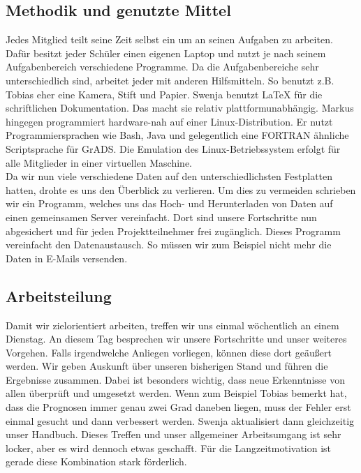 \documentclass[a4paper,oneside,12pt,titlepage]{article}
\begin{document}
    \subsection{Methodik und genutzte Mittel}
        Jedes Mitglied teilt seine Zeit selbst ein um an seinen Aufgaben zu arbeiten. Dafür besitzt jeder Schüler einen eigenen Laptop und nutzt je nach seinem Aufgabenbereich verschiedene Programme. Da die Aufgabenbereiche sehr unterschiedlich sind, arbeitet jeder mit anderen Hilfsmitteln. So benutzt z.B. Tobias eher eine Kamera, Stift und Papier. Swenja benutzt LaTeX für die schriftlichen Dokumentation. Das macht sie relativ plattformunabhängig. Markus hingegen programmiert hardware-nah auf einer Linux-Distribution. Er nutzt Programmiersprachen wie Bash, Java und gelegentlich eine FORTRAN ähnliche Scriptsprache für GrADS. Die Emulation des Linux-Betriebssystem erfolgt für alle Mitglieder in einer virtuellen Maschine. \\Da wir nun viele verschiedene Daten auf den unterschiedlichsten Festplatten hatten, drohte es uns den Überblick zu verlieren. Um dies zu vermeiden schrieben wir ein Programm, welches uns das Hoch- und Herunterladen von Daten auf einen gemeinsamen Server vereinfacht. Dort sind unsere Fortschritte nun abgesichert und für jeden Projektteilnehmer frei zugänglich. Dieses Programm vereinfacht den Datenaustausch. So müssen wir zum Beispiel nicht mehr die Daten in E-Mails versenden. 
    \subsection{Arbeitsteilung}
        Damit wir zielorientiert arbeiten, treffen wir uns einmal wöchentlich an einem Dienstag. An diesem Tag besprechen wir unsere Fortschritte und unser weiteres Vorgehen. Falls irgendwelche Anliegen vorliegen, können diese dort geäußert werden. Wir geben Auskunft über unseren bisherigen Stand und führen die Ergebnisse zusammen. Dabei ist besonders wichtig, dass neue Erkenntnisse von allen überprüft und umgesetzt werden. Wenn zum Beispiel Tobias bemerkt hat, dass die Prognosen immer genau zwei Grad daneben liegen, muss der Fehler erst einmal gesucht und dann verbessert werden. Swenja aktualisiert dann gleichzeitig unser Handbuch. Dieses Treffen und unser allgemeiner Arbeitsumgang ist sehr locker, aber es wird dennoch etwas geschafft. Für die Langzeitmotivation ist gerade diese Kombination stark förderlich. 
\end{document}
